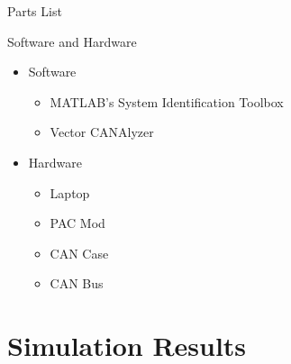 \documentclass{beamer}
\begin{document}
\begin{frame}{Parts List}
  \begin{block}{Software and Hardware}
 \begin{itemize}
        \item Software
        \begin{itemize}
        \small
        \item MATLAB's System Identification Toolbox
        \item Vector CANAlyzer
        \end{itemize}
	\item Hardware
	\begin{itemize}
	\small
	\item Laptop
	\item PAC Mod
	\item CAN Case 
	\item CAN Bus
	\end{itemize}
\end{itemize}
  \end{block}
\end{frame}

\section{Simulation Results}
\end{document}
